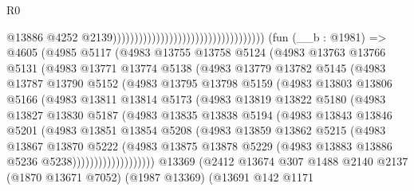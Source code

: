 \begin{lexlean}{R0}
\begin{coremodule}
                                                                          @13886
                                                                          @4252
                                                                          @2139)))))))))))))))))))))))))))))))))))
    (fun (__b : @1981) =>
    @4605
      (@4985
        @5117
        (@4983
          @13755
          @13758
          @5124
          (@4983
            @13763
            @13766
            @5131
            (@4983
              @13771
              @13774
              @5138
              (@4983
                @13779
                @13782
                @5145
                (@4983
                  @13787
                  @13790
                  @5152
                  (@4983
                    @13795
                    @13798
                    @5159
                    (@4983
                      @13803
                      @13806
                      @5166
                      (@4983
                        @13811
                        @13814
                        @5173
                        (@4983
                          @13819
                          @13822
                          @5180
                          (@4983
                            @13827
                            @13830
                            @5187
                            (@4983
                              @13835
                              @13838
                              @5194
                              (@4983
                                @13843
                                @13846
                                @5201
                                (@4983
                                  @13851
                                  @13854
                                  @5208
                                  (@4983
                                    @13859
                                    @13862
                                    @5215
                                    (@4983
                                      @13867
                                      @13870
                                      @5222
                                      (@4983
                                        @13875
                                        @13878
                                        @5229
                                        (@4983 @13883 @13886 @5236 @5238)))))))))))))))))))
    @13369
    (@2412
      @13674
      @307
      @1488
      @2140
      @2137
      (@1870 @13671 @7052)
      (@1987 @13369)
      (@13691
        @142
        @1171

\end{coremodule}
\end{lexlean}
